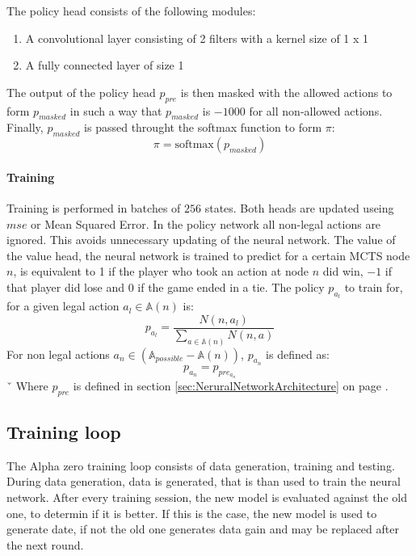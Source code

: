 \documentclass[12pt]{article}
\newcommand{\sectionref}[1]{section \ref{#1} on page \pageref{#1}}
\begin{document}
The policy head consists of the following modules:
\begin{enumerate}
\item A convolutional layer consisting of 2 filters with a kernel size of 1 x 1
\item A fully connected layer of size 1
\end{enumerate}
The output of the policy head \(p_{pre}\) is then masked with the allowed actions to form \(p_{masked}\) in such a way that \(p_{masked}\) is \(-1000\) for all non-allowed actions. Finally, \(p_{masked}\) is passed throught the softmax function to form \(\pi\):
\begin{equation}\label{eq:nn:policyDefinition}
\pi = \text{softmax}(p_{masked})
\end{equation}

\paragraph{Training}\label{sec:Methods:NN:A0:Training}
Training is performed in batches of \(256\) states. Both heads are updated useing \(mse\) or Mean Squared Error. In the policy network all non-legal actions are ignored. This avoids unnecessary updating of the neural network. The value of the value head, the neural network is trained to predict for a certain MCTS node \(n\), is equivalent to 1 if the player who took an action at node \(n\) did win, \(-1\) if that player did lose and \(0\) if the game ended in a tie. The policy \(p_{a_l}\) to train for, for a given legal action \(a_l \in \mathbb A(n)\) is:
\begin{equation} \label{eq:NN:policy_computation}
p_{a_l} = \frac{N(n, a_l)}{\sum_{a\in \mathbb A(n)} N(n, a)}
\end{equation}
For non legal actions \(a_n \in (\mathbb A_{possible} - \mathbb A(n))\), \(p_{a_n}\) is defined as:
\begin{equation} \label{eq:NN:policy_computation_nonlegal}
p_{a_n} = p_{pre_{a_n}}
\end{equation}ˇ
Where \(p_{pre}\) is defined in \sectionref{sec:NeruralNetworkArchitecture}.

\subsection{Training loop}
The Alpha zero training loop consists of data generation, training and testing. During data generation, data is generated, that is than used to train the neural network. After every training session, the new model is evaluated against the old one, to determin if it is better. If this is the case, the new model is used to generate date, if not the old one generates data gain and may be replaced after the next round.
\end{document}
